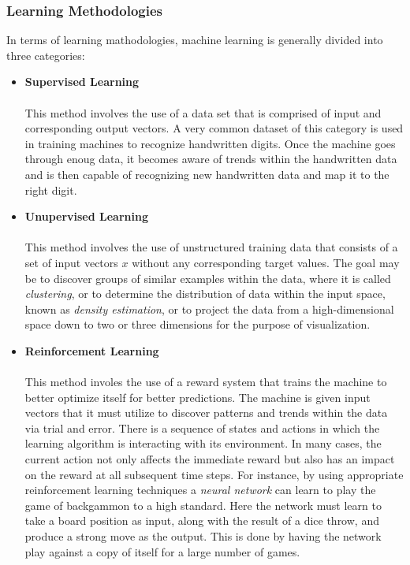 \documentclass[hidelinks,11pt]{article}
\begin{document}
	\subsubsection{Learning Methodologies}
	In terms of learning mathodologies, machine learning is generally divided into three categories: 
	\begin{itemize}
		\item \textbf{Supervised Learning}\paragraph{}
		This method involves the use of a data set that is comprised of input and corresponding output vectors. A very common dataset of this category is used in training machines to recognize handwritten digits. Once the machine goes through enoug data, it becomes aware of trends within the handwritten data and is then capable of recognizing new handwritten data and map it to the right digit. \cite{BOOK:3} 
		\item \textbf{Unupervised Learning}\paragraph{}
		This method involves the use of unstructured training data that consists of a set of input vectors $x$ without any corresponding target values. The goal may be to discover groups of similar examples within the data, where it is called \textit{clustering}, or to determine the distribution of data within the input space, known as \textit{density estimation}, or to project the data from a high-dimensional space down to two or three dimensions for the purpose of visualization.\cite{BOOK:3} 

		\item \textbf{Reinforcement Learning}\paragraph{}
		This method involes the use of a reward system that trains the machine to better optimize itself for better predictions. The machine is given input vectors that it must utilize to discover patterns and trends within the data via trial and error. There is a sequence of states and actions in which the learning algorithm is interacting with its environment. In many cases, the current action not only affects the immediate reward but also has an impact on the reward at all subsequent time steps. For instance, by using appropriate reinforcement learning techniques a \textit{neural network} can learn to play the game of backgammon to a high standard. Here the network must learn to take a board position as input, along with the result of a dice throw, and produce a strong move as the output. This is done by having the network play against a copy of itself for a large number of games.\cite{BOOK:3} 
	\end{itemize}
	
\end{document}
